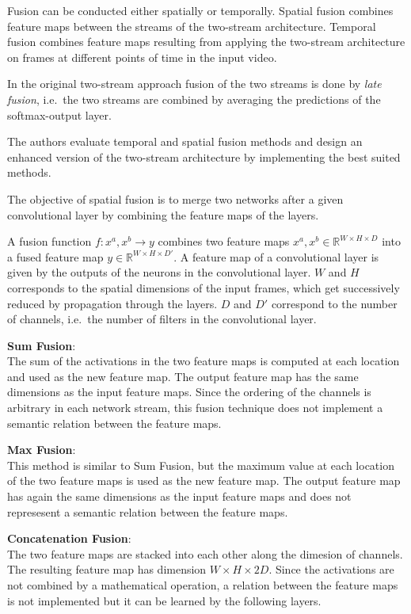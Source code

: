 Fusion can be conducted either spatially or temporally.
Spatial fusion combines feature maps between the streams of the two-stream architecture. Temporal fusion combines feature maps resulting from applying the two-stream architecture on frames at different points of time in the input video.

In the original two-stream approach \cite{simonyan_two-stream_2014} fusion of the two streams is done by \textit{late fusion}, i.e.\ the two streams are combined by averaging the predictions of the softmax-output layer.

The authors evaluate temporal and spatial fusion methods and design an enhanced version of the two-stream architecture by implementing the best suited methods.

The objective of spatial fusion is to merge two networks after a given convolutional layer by combining the feature maps of the layers.

A fusion function $f: x^a, x^b \rightarrow y$ combines two feature maps $x^a, x^b \in \mathbb{R}^{W \times H \times D}$ into a fused feature map $y \in \mathbb{R}^{W \times H \times D'}$.
A feature map of a convolutional layer is given by the outputs of the neurons in the convolutional layer.
$W$ and $H$ corresponds to the spatial dimensions of the input frames, which get successively reduced by propagation through the layers.
$D$ and $D'$ correspond to the number of channels, i.e.\ the number of filters in the convolutional layer. 

\textbf{Sum Fusion}:\\
The sum of the activations in the two feature maps is computed at each location and used as the new feature map.
The output feature map has the same dimensions as the input feature maps.
Since the ordering of the channels is arbitrary in each network stream, this fusion technique does not implement a semantic relation between the feature maps.

\textbf{Max Fusion}:\\
This method is similar to Sum Fusion, but the maximum value at each location of the two feature maps is used as the new feature map.
The output feature map has again the same dimensions as the input feature maps and does not represesent a semantic relation between the feature maps.

\textbf{Concatenation Fusion}:\\
The two feature maps are stacked into each other along the dimesion of channels.
The resulting feature map has dimension $W \times H \times 2D$.
Since the activations are not combined by a mathematical operation, a relation between the feature maps is not implemented but it can be learned by the following layers.

